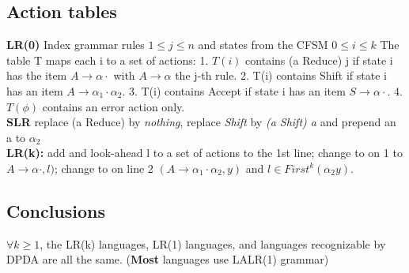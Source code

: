 	\subsection*{Action tables}
	\textbf{LR(0)} Index grammar rules $1 \leqslant j \leqslant n$ and states from the CFSM $0 \leqslant i \leqslant k$ The table T maps each i to a set of actions: 1. $T(i)$ contains (a Reduce) j if state i has the item $A \rightarrow \alpha \cdotp$ with $A \rightarrow \alpha$ the j-th rule. 2. T(i) contains Shift if state i has an item $A \rightarrow \alpha_1 \cdotp \alpha_2$. 3. T(i) contains Accept if state i has an item $S \rightarrow \alpha \cdotp$. 4. $T(\phi)$ contains an error action only.\\
	\textbf{SLR} replace (a Reduce) by \textit{nothing}, replace \textit{Shift} by \textit{(a Shift) a} and prepend an a to $\alpha_2$\\
	\textbf{LR(k):} add and look-ahead l to a set of actions to the 1st line; change to on 1 to $A \rightarrow \alpha \cdotp , l)$; change to on line 2 $(A \rightarrow \alpha_1 \cdotp \alpha_2,y)$ and $l \in First^k(\alpha_2 y)$.
	\subsection*{Conclusions}
$\forall k \geqslant 1$, the LR(k) languages, LR(1) languages, and languages recognizable by DPDA are all the same. (\textbf{Most} languages use LALR(1) grammar)
